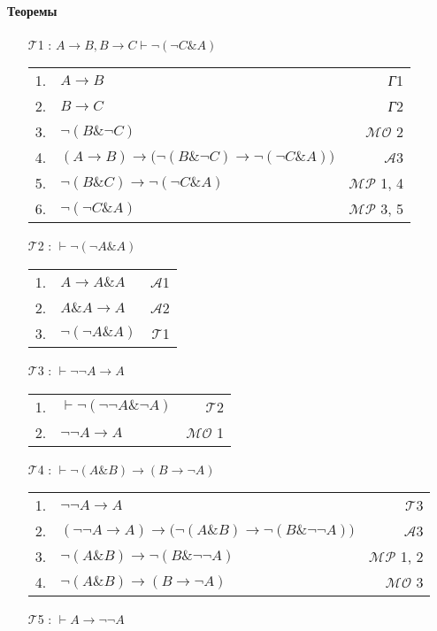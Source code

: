 \documentclass{article}
\begin{document}
\paragraph{Теоремы}
\begin{itemize}
\item[$\mathcal{T}$1]: $A\rightarrow B, B\rightarrow C\vdash\neg\left(\neg C\&A\right)$

\begin{tabular}{llr}
1. & $A\rightarrow B$ & \textit{Г}1\\
2. & $B\rightarrow C$ & \textit{Г}2\\
3. & $\neg\left(B\&\neg C\right)$ &$\mathcal{MO}$ 2\\
4. & $\left(A\rightarrow B\right)\rightarrow\bigl(\neg\left(B\&\neg C\right)\rightarrow\neg\left(\neg C\&A\right)\bigr)$ & $\mathcal{A}$3\\
5. & $\neg\left(B\& C\right)\rightarrow\neg\left(\neg C\& A\right)$ & $\mathcal{MP}$ 1, 4\\
6. & $\neg\left(\neg C\& A\right)$ & $\mathcal{MP}$ 3, 5
\end{tabular}
\item[$\mathcal{T}$2]: $\vdash\neg\left(\neg A\& A\right)$

\begin{tabular}{llr}
1. & $A\rightarrow A\& A$ & $\mathcal{A}$1\\
2. & $A\& A\rightarrow A$ & $\mathcal{A}$2\\
3. & $\neg\left(\neg A\& A\right)$ & $\mathcal{T}$1
\end{tabular}
\item[$\mathcal{T}$3]: $\vdash \neg\neg A\rightarrow A$

\begin{tabular}{llr}
1. & $\vdash\neg\left(\neg\neg A\&\neg A\right)$ & $\mathcal{T}$2\\
2. & $\neg\neg A\rightarrow A$ &$\mathcal{MO}$ 1
\end{tabular}
\item[$\mathcal{T}$4]: $\vdash\neg\left(A\& B\right)\rightarrow\left(B\rightarrow\neg A\right)$

\begin{tabular}{llr}
1. & $\neg\neg A\rightarrow A$ & $\mathcal{T}$3\\
2. & $\left(\neg\neg A\rightarrow A\right)\rightarrow\bigl(\neg\left(A\& B\right)\rightarrow\neg\left(B\&\neg\neg A\right)\bigr)$ & $\mathcal{A}$3\\
3. & $\neg\left(A\& B\right)\rightarrow\neg\left(B\&\neg\neg A\right)$ & $\mathcal{MP}$ 1, 2\\
4. & $\neg\left(A\& B\right)\rightarrow\left(B\rightarrow\neg A\right)$ &$\mathcal{MO}$ 3
\end{tabular}
\item[$\mathcal{T}$5]: $\vdash A\rightarrow\neg\neg A$


\end{itemize}
\end{document}
